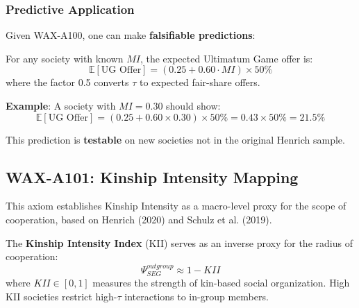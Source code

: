 \subsubsection{Predictive Application}

Given WAX-A100, one can make \textbf{falsifiable predictions}:

\begin{corollary}
For any society with known $MI$, the expected Ultimatum Game offer is:
\begin{equation}
\mathbb{E}[\text{UG Offer}] = (0.25 + 0.60 \cdot MI) \times 50\%
\end{equation}
where the factor 0.5 converts $\tau$ to expected fair-share offers.
\end{corollary}

\textbf{Example}: A society with $MI = 0.30$ should show:
\begin{equation}
\mathbb{E}[\text{UG Offer}] = (0.25 + 0.60 \times 0.30) \times 50\% = 0.43 \times 50\% = 21.5\%
\end{equation}

This prediction is \textbf{testable} on new societies not in the original Henrich sample.




\subsection{WAX-A101: Kinship Intensity Mapping}
\label{sec:wax-a101}

This axiom establishes Kinship Intensity as a macro-level proxy for the scope of cooperation, based on Henrich (2020) and Schulz et al. (2019).

\begin{axiom}
\label{ax:kinship-intensity}
The \textbf{Kinship Intensity Index} (KII) serves as an inverse proxy for the radius of cooperation:
\begin{equation}
\Psi_{SEG}^{outgroup} \approx 1 - KII
\end{equation}
where $KII \in [0,1]$ measures the strength of kin-based social organization. High KII societies restrict high-$\tau$ interactions to in-group members.
\end{axiom}

